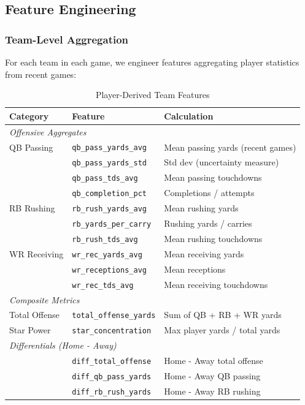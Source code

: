\subsection{Feature Engineering}

\subsubsection{Team-Level Aggregation}

For each team in each game, we engineer features aggregating player statistics from recent games:

\begin{table}[htbp]
\centering
\caption{Player-Derived Team Features}
\label{tab:player-features}
\begin{tabular}{lll}
\toprule
\textbf{Category} & \textbf{Feature} & \textbf{Calculation} \\
\midrule
\multicolumn{3}{l}{\textit{Offensive Aggregates}} \\
QB Passing & \texttt{qb\_pass\_yards\_avg} & Mean passing yards (recent games) \\
 & \texttt{qb\_pass\_yards\_std} & Std dev (uncertainty measure) \\
 & \texttt{qb\_pass\_tds\_avg} & Mean passing touchdowns \\
 & \texttt{qb\_completion\_pct} & Completions / attempts \\
\midrule
RB Rushing & \texttt{rb\_rush\_yards\_avg} & Mean rushing yards \\
 & \texttt{rb\_yards\_per\_carry} & Rushing yards / carries \\
 & \texttt{rb\_rush\_tds\_avg} & Mean rushing touchdowns \\
\midrule
WR Receiving & \texttt{wr\_rec\_yards\_avg} & Mean receiving yards \\
 & \texttt{wr\_receptions\_avg} & Mean receptions \\
 & \texttt{wr\_rec\_tds\_avg} & Mean receiving touchdowns \\
\midrule
\multicolumn{3}{l}{\textit{Composite Metrics}} \\
Total Offense & \texttt{total\_offense\_yards} & Sum of QB + RB + WR yards \\
Star Power & \texttt{star\_concentration} & Max player yards / total yards \\
\midrule
\multicolumn{3}{l}{\textit{Differentials (Home - Away)}} \\
 & \texttt{diff\_total\_offense} & Home - Away total offense \\
 & \texttt{diff\_qb\_pass\_yards} & Home - Away QB passing \\
 & \texttt{diff\_rb\_rush\_yards} & Home - Away RB rushing \\
\bottomrule
\end{tabular}
\end{table}

